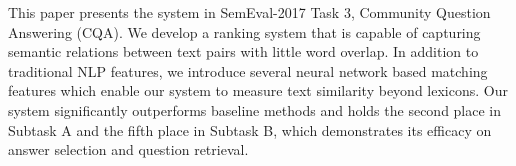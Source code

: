 This paper presents the system in SemEval-2017 Task 3, Community Question Answering (CQA). We develop a ranking system that is capable of capturing semantic relations between text pairs with little word overlap.  In addition to traditional NLP features, we introduce several neural network based matching features which enable our system to measure text similarity beyond lexicons. Our system significantly outperforms baseline methods and holds the second place in Subtask A and the fifth place in Subtask B, which demonstrates its efficacy on answer selection and question retrieval.
